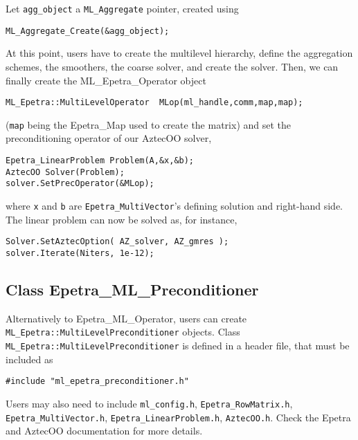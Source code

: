 Let \verb!agg_object! a \verb!ML_Aggregate! pointer, created using
\begin{verbatim}
ML_Aggregate_Create(&agg_object);
\end{verbatim}
At this point, users have to create the multilevel hierarchy, define the
aggregation schemes, the smoothers, the coarse solver, and create the solver.
Then, we can finally create the ML\_Epetra\_Operator object
\begin{verbatim}
ML_Epetra::MultiLevelOperator  MLop(ml_handle,comm,map,map);
\end{verbatim}
(\verb!map! being the Epetra\_Map used to create the matrix) and set the
preconditioning operator of our AztecOO solver,
\begin{verbatim}
Epetra_LinearProblem Problem(A,&x,&b);
AztecOO Solver(Problem);
solver.SetPrecOperator(&MLop);
\end{verbatim}
where \verb!x! and \verb!b! are \verb!Epetra_MultiVector!'s defining
solution and right-hand side. The linear problem can now be solved as,
for instance,
\begin{verbatim}
Solver.SetAztecOption( AZ_solver, AZ_gmres );
solver.Iterate(Niters, 1e-12);
\end{verbatim}


\subsection{Class Epetra\_ML\_Preconditioner}
\label{ML_Preconditioner}

Alternatively to Epetra\_ML\_Operator, users can create
\verb!ML_Epetra::MultiLevelPreconditioner!  objects.  Class
\verb!ML_Epetra::MultiLevelPreconditioner! is defined in a header file,
that must be included as
\begin{verbatim}
#include "ml_epetra_preconditioner.h" 
\end{verbatim}
Users may also need to include \verb!ml_config.h!,
\verb!Epetra_RowMatrix.h!, \verb!Epetra_MultiVector.h!,
\verb!Epetra_LinearProblem.h!,  \verb!AztecOO.h!. Check the Epetra and
AztecOO documentation for more details.

